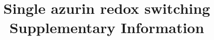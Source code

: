\documentclass[11pt,a4paper,onecolumn]{article}
\newcommand*{\affaddr}[1]{#1} %
\newcommand*{\email}[1]{\texttt{#1}} %
\begin{document}

\date{\vspace{1ex}} %
\title{\textbf{Single azurin redox switching}\\ \vspace{3ex} Supplementary Information \vspace{3ex}}
\maketitle
\tableofcontents
\pagebreak
\end{document}
